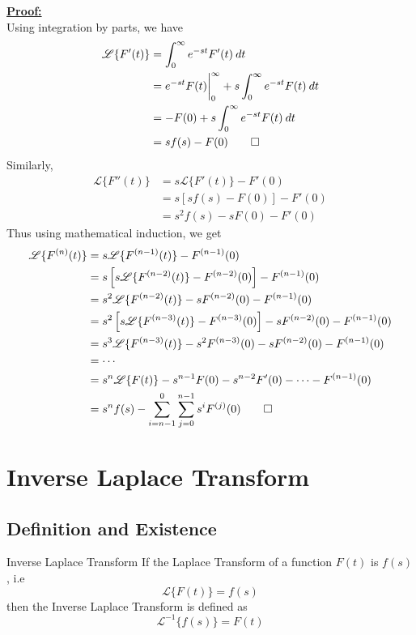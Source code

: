 \documentclass[12pt]{article}
\newcommand{\Lap}{\mathscr{L}}
\newcommand{\Lapinv}{\mathscr{L}^{-1}}
\begin{document}
\underline{\textbf{Proof: }} \\
Using integration by parts, we have
\begin{align*}
    \Lap \{ F'(t) \} &= \int_{0}^{\infty} {e^{-st}F'(t)} \: d{t} \\
    &= e^{-st}F(t)\bigg|_{0}^{\infty} + s \int_{0}^{\infty} {e^{-st}F(t)} \: d{t}  \\
    &= - F(0) + s \int_{0}^{\infty} {e^{-st}F(t)} \: d{t} \\
    &= sf(s) - F(0) \qed
\end{align*}
Similarly,
\begin{align*}
    \Lap \{ F''(t) \} &= s \Lap \{ F'(t) \} - F'(0) \\
    &= s \left[ sf(s) - F(0) \right] - F'(0) \\
    &= s^2f(s) - sF(0) - F'(0)
\end{align*}
Thus using mathematical induction, we get
\begin{align*}
    \Lap \{ F^{(n)}(t) \} &= s \Lap \{ F^{(n-1)}(t) \} - F^{(n-1)}(0) \\
    &= s \left[ s \Lap \{ F^{(n-2)}(t) \} - F^{(n-2)}(0) \right] - F^{(n-1)}(0) \\
    &= s^2 \Lap \{ F^{(n-2)}(t) \} - sF^{(n-2)}(0) - F^{(n-1)}(0) \\
    &= s^2 \left[ s \Lap \{ F^{(n-3)}(t) \} - F^{(n-3)}(0) \right] - sF^{(n-2)}(0) - F^{(n-1)}(0) \\
    &= s^3 \Lap \{ F^{(n-3)}(t) \} - s^2F^{(n-3)}(0) - sF^{(n-2)}(0) - F^{(n-1)}(0) \\
    &= \cdots \\
    &= s^n \Lap \{ F(t) \} - s^{n-1}F(0) - s^{n-2}F'(0) - \cdots - F^{(n-1)}(0) \\
    &= s^nf(s) - \sum_{i=n-1}^{0}\sum_{j=0}^{n-1} s^i F^{(j)}(0) \qed
\end{align*}

\newpage
\section{Inverse Laplace Transform}

\subsection{Definition and Existence}

\begin{definition}{Inverse Laplace Transform}{}
    If the Laplace Transform of a function $F(t)$ is $f(s)$, i.e
    \[
        \Lap \{ F(t) \} = f(s)
    \] 
    then the Inverse Laplace Transform is defined as
    \[
        \Lapinv \{ f(s) \} = F(t)
    \]
\end{definition}
\end{document}
